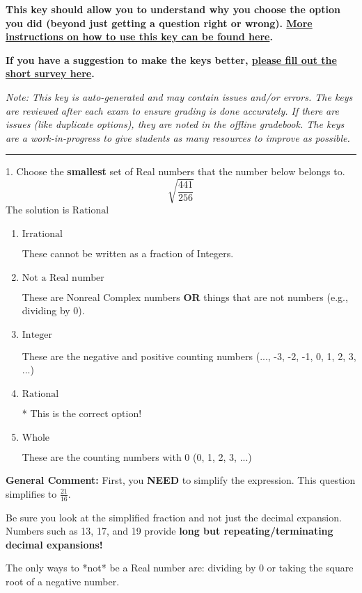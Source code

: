 \documentclass{extbook}[14pt]
\begin{document}
\textbf{This key should allow you to understand why you choose the option you did (beyond just getting a question right or wrong). \href{https://xronos.clas.ufl.edu/mac1105spring2020/courseDescriptionAndMisc/Exams/LearningFromResults}{More instructions on how to use this key can be found here}.}

\textbf{If you have a suggestion to make the keys better, \href{https://forms.gle/CZkbZmPbC9XALEE88}{please fill out the short survey here}.}

\textit{Note: This key is auto-generated and may contain issues and/or errors. The keys are reviewed after each exam to ensure grading is done accurately. If there are issues (like duplicate options), they are noted in the offline gradebook. The keys are a work-in-progress to give students as many resources to improve as possible.}

\rule{\textwidth}{0.4pt}

1. Choose the \textbf{smallest} set of Real numbers that the number below belongs to.
\[ \sqrt{\frac{441}{256}} \] 
The solution is $ \text{Rational} $ 

\begin{enumerate}[label=\Alph*.] 
\item $ \text{Irrational} $ 

 These cannot be written as a fraction of Integers. 
\item $ \text{Not a Real number} $ 

 These are Nonreal Complex numbers \textbf{OR} things that are not numbers (e.g., dividing by 0). 
\item $ \text{Integer} $ 

 These are the negative and positive counting numbers (..., -3, -2, -1, 0, 1, 2, 3, ...) 
\item $ \text{Rational} $ 

 * This is the correct option! 
\item $ \text{Whole} $ 

 These are the counting numbers with 0 (0, 1, 2, 3, ...) 
\end{enumerate} 
 
\textbf{General Comment:} First, you \textbf{NEED} to simplify the expression. This question simplifies to $\frac{21}{16}$. 
 
 Be sure you look at the simplified fraction and not just the decimal expansion. Numbers such as 13, 17, and 19 provide \textbf{long but repeating/terminating decimal expansions!} 
 
 The only ways to *not* be a Real number are: dividing by 0 or taking the square root of a negative number. 
 
\end{document}
